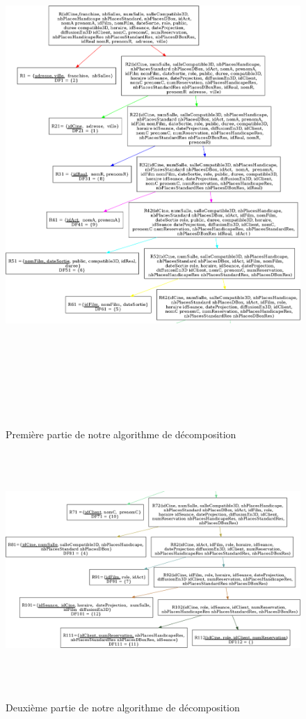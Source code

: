 \documentclass[a4paper,sffamily,12pt]{article}
\begin{document}
				\begin{figure}[!h]		
					\hspace{-2cm}
					{\includegraphics[height=19cm]{picture/decomp1.png}}
					\caption{Première partie de notre algorithme de décomposition}
					\label{decomp1}	
				\end{figure}	
			
				\begin{figure}[!h]		
					\hspace{-2cm}
					{\includegraphics[height=9cm]{picture/decomp2.png}}
					\caption{Deuxième partie de notre algorithme de décomposition}
					\label{decomp2}	
				\end{figure}		
\end{document}
